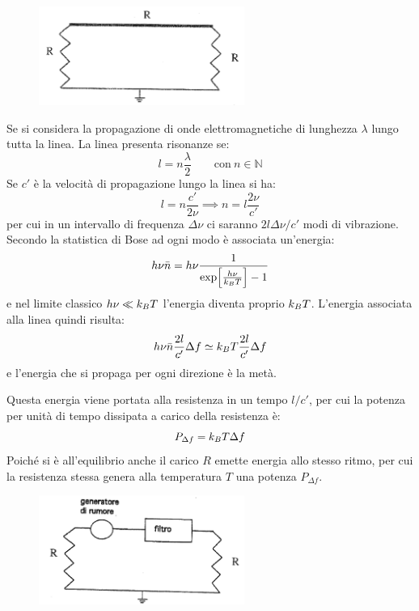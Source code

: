 \begin{figure}[b]
	\centering
	\includegraphics[width=0.6\textwidth]{Immagini/NyquistLine.png}
	\vspace{-10pt}
	\caption{}
	\label{fig:nyqline}
	\vspace{-10pt}
\end{figure}

Se si considera la propagazione di onde elettromagnetiche di lunghezza $ \lambda $ lungo tutta la linea. La linea presenta risonanze se:
\[ l = n \frac{\lambda}{2} \qquad \text{con}~n \in \mathbb{N} \]
Se $ c' $ è la velocità di propagazione lungo la linea si ha:
\[ l = n \frac{c'}{2 \nu} \implies n = l \frac{2\nu}{c'} \]
per cui in un intervallo di frequenza $ \Delta \nu $ ci saranno $ 2l \Delta \nu /c' $ modi di vibrazione.
Secondo la statistica di Bose ad ogni modo è associata un'energia:
\[ h\nu \bar{n} = h \nu \frac{1}{\exp[\frac{h\nu}{k_B T}] - 1} \]
e nel limite classico $ h\nu \ll k_B T $ l'energia diventa proprio $ k_B T $. L'energia associata alla linea quindi risulta:
\[ h\nu \bar{n} \frac{2l}{c'} \Delta f \simeq k_B T \frac{2l}{c'} \Delta f \]
e l'energia che si propaga per ogni direzione è la metà.

Questa energia viene portata alla resistenza in un tempo $ l/c' $, per cui la potenza per unità di tempo dissipata a carico della resistenza è:
\[ P_{\Delta f} = k_B T \Delta f \]
Poiché si è all'equilibrio anche il carico $ R $ emette energia allo stesso ritmo, per cui la resistenza stessa genera alla temperatura $ T $ una potenza $ P_{\Delta f} $.

\begin{figure}[t]
	\centering
	\includegraphics[width=0.6\textwidth]{Immagini/NyquistNoiseGenerator.png}
	\vspace{-5pt}
	\caption{}
	\label{fig:nyqgen}
	\vspace{-10pt}
\end{figure}

